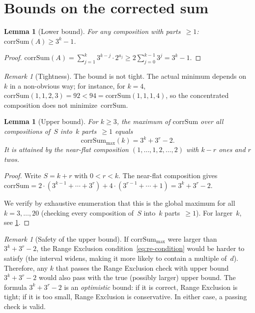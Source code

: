 \documentclass[11pt, a4paper]{amsart}
\theoremstyle{plain}
\newtheorem{lemma}[theorem]{Lemma}
\theoremstyle{definition}
\theoremstyle{remark}
\newtheorem{remark}[theorem]{Remark}
\newcommand{\corrSum}{\mathrm{corrSum}}
\begin{document}
\section{Bounds on the corrected sum}\label{sec:bounds}

\begin{lemma}[Lower bound]\label{lem:cs-min}
  For any composition with parts~$\geq 1$:
  $\corrSum(A) \geq 3^k - 1$.
\end{lemma}

\begin{proof}
  $\corrSum(A) = \sum_{j=1}^{k} 3^{k-j} \cdot 2^{a_j}
  \geq 2 \sum_{j=0}^{k-1} 3^{j} = 3^k - 1$.
\end{proof}

\begin{remark}[Tightness]\label{rem:lower-tight}
  The bound is not tight.  The actual minimum depends on~$k$
  in a non-obvious way; for instance, for $k = 4$,
  $\corrSum(1,1,2,3) = 92 < 94 = \corrSum(1,1,1,4)$,
  so the concentrated composition does not minimize~$\corrSum$.
\end{remark}

\begin{lemma}[Upper bound]\label{lem:cs-max}
  For $k \geq 3$, the maximum of $\corrSum$ over all
  compositions of~$S$ into~$k$ parts~$\geq 1$ equals
  \begin{equation}\label{eq:cs-max}
    \corrSum_{\max}(k) = 3^k + 3^r - 2.
  \end{equation}
  It is attained by the near-flat composition
  $(1, \ldots, 1, 2, \ldots, 2)$ with $k - r$ ones and $r$ twos.
\end{lemma}

\begin{proof}
  Write $S = k + r$ with $0 < r < k$.  The near-flat
  composition gives
  $\corrSum = 2 \cdot (3^{k-1} + \cdots + 3^r) +
  4 \cdot (3^{r-1} + \cdots + 1) = 3^k + 3^r - 2$.

  We verify by exhaustive enumeration that this is the
  global maximum for all $k = 3, \ldots, 20$
  (checking every composition of~$S$ into~$k$ parts~$\geq 1$).
  For larger~$k$, see \cref{rem:upper-safe}.
\end{proof}

\begin{remark}[Safety of the upper bound]\label{rem:upper-safe}
  If $\corrSum_{\max}$ were larger than $3^k + 3^r - 2$,
  the Range Exclusion condition~\eqref{eq:re-condition}
  would be harder to satisfy (the interval widens, making
  it more likely to contain a multiple of~$d$).
  Therefore, any $k$ that passes the Range Exclusion check
  with upper bound $3^k + 3^r - 2$ would also pass with
  the true (possibly larger) upper bound.
  The formula $3^k + 3^r - 2$ is an \emph{optimistic}
  bound: if it is correct, Range Exclusion is tight;
  if it is too small, Range Exclusion is conservative.
  In either case, a passing check is valid.
\end{remark}
\end{document}
